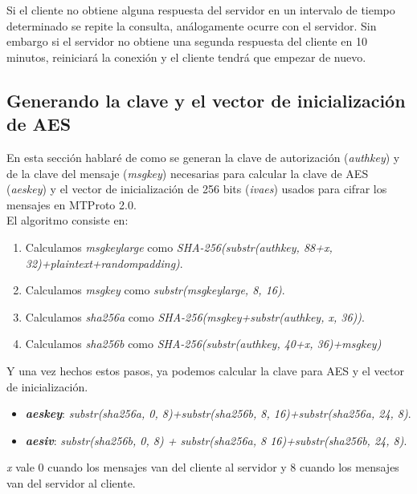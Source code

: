 Si el cliente no obtiene alguna respuesta del servidor en un intervalo de tiempo determinado se repite la consulta, análogamente ocurre con el servidor. Sin embargo si el servidor no obtiene una segunda respuesta del cliente en 10 minutos, reiniciará la conexión y el cliente tendrá que empezar de nuevo.

\subsection{Generando la clave y el vector de inicialización de AES}
En esta sección hablaré de como se generan la clave de autorización (\emph{auth\textunderscore key}) y de la clave del mensaje (\emph{msg\textunderscore key}) necesarias para calcular la clave de AES (\emph{aes\textunderscore key}) y el vector de inicialización de 256 bits (\emph{iv\textunderscore aes}) usados para cifrar los mensajes en MTProto 2.0.\\
El algoritmo consiste en:
\begin{enumerate}
	\item Calculamos \emph{msg\textunderscore key\textunderscore large} como \emph{SHA-256(substr(auth\textunderscore key, 88+x, 32)+plaintext+random\textunderscore padding)}.
	\item Calculamos \emph{msg\textunderscore key} como \emph{substr(msg\textunderscore key\textunderscore large, 8, 16)}.
	\item Calculamos \emph{sha256\textunderscore a} como \emph{SHA-256(msg\textunderscore key+substr(auth\textunderscore key, x, 36))}.
	\item Calculamos \emph{sha256\textunderscore b} como \emph{SHA-256(substr(auth\textunderscore key, 40+x, 36)+msg\textunderscore key)}
\end{enumerate}
Y una vez hechos estos pasos, ya podemos calcular la clave para AES y el vector de inicialización.
\begin{itemize}
	\item \textbf{\emph{aes\textunderscore key}}: \emph{substr(sha256\textunderscore a, 0, 8)+substr(sha256\textunderscore b, 8, 16)+substr(sha256\textunderscore a, 24, 8)}.
	\item \textbf{\emph{aes\textunderscore iv}}: \emph{substr(sha256\textunderscore b, 0, 8) + substr(sha256\textunderscore a, 8 16)+substr(sha256\textunderscore b, 24, 8)}.
\end{itemize}
\emph{x} vale 0 cuando los mensajes van del cliente al servidor y 8 cuando los mensajes van del servidor al cliente.\\
